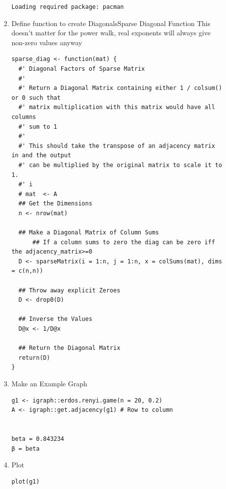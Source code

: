 \documentclass[11pt]{article}
\begin{document}
\begin{enumerate}
\begin{enumerate}
\begin{enumerate}
\begin{verbatim}
Loading required package: pacman
\end{verbatim}

\item Define function to create DiagonalsSparse Diagonal Function
\label{sec:org9ec0913}
This doesn't matter for the power walk, real exponents will always give non-zero values anyway
\lstset{language=r,label= ,caption= ,captionpos=b,numbers=none}
\begin{lstlisting}
sparse_diag <- function(mat) {
  #' Diagonal Factors of Sparse Matrix
  #'
  #' Return a Diagonal Matrix containing either 1 / colsum() or 0 such that
  #' matrix multiplication with this matrix would have all columns
  #' sum to 1
  #'
  #' This should take the transpose of an adjacency matrix in and the output
  #' can be multiplied by the original matrix to scale it to 1.
  #' i
  # mat  <- A
  ## Get the Dimensions
  n <- nrow(mat)

  ## Make a Diagonal Matrix of Column Sums
      ## If a column sums to zero the diag can be zero iff the adjacency_matrix>=0
  D <- sparseMatrix(i = 1:n, j = 1:n, x = colSums(mat), dims = c(n,n))

  ## Throw away explicit Zeroes
  D <- drop0(D)

  ## Inverse the Values
  D@x <- 1/D@x

  ## Return the Diagonal Matrix
  return(D)
}
\end{lstlisting}

\item Make an Example Graph
\label{sec:orgfe53f65}
\lstset{language=r,label= ,caption= ,captionpos=b,numbers=none}
\begin{lstlisting}
g1 <- igraph::erdos.renyi.game(n = 20, 0.2)
A <- igraph::get.adjacency(g1) # Row to column


beta = 0.843234
β = beta
\end{lstlisting}
\item Plot
\label{sec:org4ae830b}

\lstset{language=r,label= ,caption= ,captionpos=b,numbers=none}
\begin{lstlisting}
plot(g1)
\end{lstlisting}


\end{enumerate}
\end{enumerate}
\end{enumerate}
\end{document}
